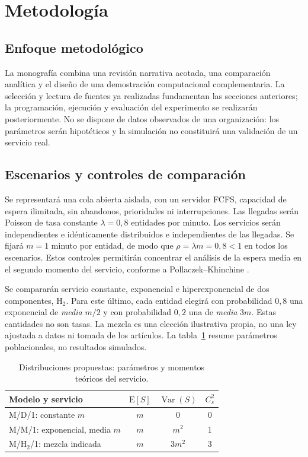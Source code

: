 
\section{Metodología}
\label{sec:metodologia}

\subsection{Enfoque metodológico}
\label{subsec:metodo-enfoque}

La monografía combina una revisión narrativa acotada, una comparación analítica y el diseño de una demostración computacional complementaria. La selección y lectura de fuentes ya realizadas fundamentan las secciones anteriores; la programación, ejecución y evaluación del experimento se realizarán posteriormente. No se dispone de datos observados de una organización: los parámetros serán hipotéticos y la simulación no constituirá una validación de un servicio real.

\subsection{Escenarios y controles de comparación}
\label{subsec:metodo-escenarios}

Se representará una cola abierta aislada, con un servidor FCFS, capacidad de espera ilimitada, sin abandonos, prioridades ni interrupciones. Las llegadas serán Poisson de tasa constante $\lambda=0{,}8$ entidades por minuto. Los servicios serán independientes e idénticamente distribuidos e independientes de las llegadas. Se fijará $m=1$ minuto por entidad, de modo que $\rho=\lambda m=0{,}8<1$ en todos los escenarios. Estos controles permitirán concentrar el análisis de la espera media en el segundo momento del servicio, conforme a Pollaczek--Khinchine \cite{virtamoMG1}.

Se compararán servicio constante, exponencial e hiperexponencial de dos componentes, H$_2$. Para este último, cada entidad elegirá con probabilidad $0{,}8$ una exponencial de \emph{media} $m/2$ y con probabilidad $0{,}2$ una de \emph{media} $3m$. Estas cantidades no son tasas. La mezcla es una elección ilustrativa propia, no una ley ajustada a datos ni tomada de los artículos. La tabla~\ref{tab:metodo-servicios} resume parámetros poblacionales, no resultados simulados.

\begin{table}[htbp]
  \centering
  \caption{Distribuciones propuestas: parámetros y momentos teóricos del servicio.}
  \label{tab:metodo-servicios}
  \begin{tabular}{lccc}
    \hline
    Modelo y servicio & $\mathrm{E}[S]$ & $\operatorname{Var}(S)$ & $C_s^2$ \\
    \hline
    M/D/1: constante $m$ & $m$ & $0$ & $0$ \\
    M/M/1: exponencial, media $m$ & $m$ & $m^2$ & $1$ \\
    M/H$_2$/1: mezcla indicada & $m$ & $3m^2$ & $3$ \\
    \hline
  \end{tabular}
\end{table}

